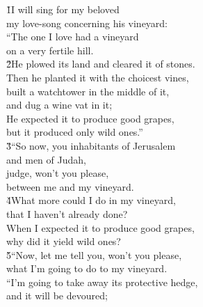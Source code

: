 \begin{poetry}
\poeml {}
\v{1}I will sing for my beloved \\
\poemll    my love-song concerning his vineyard: \\
\poeml ``The one I love had a vineyard \\
\poemll    on a very fertile hill. \\
\poeml \v{2}He plowed its land and cleared it of stones. \\
\poemll    Then he planted it with the choicest vines, \\
\poeml built a watchtower in the middle of it, \\
\poemll    and dug a wine vat in it; \\
\poeml He expected it to produce good grapes, \\
\poemll    but it produced only wild ones.'' \\
\poeml \v{3}``So now, you inhabitants of Jerusalem \\
\poemll    and men of Judah, \\
\poeml judge, won't you please, \\
\poemll    between me and my vineyard. \\
\poeml \v{4}What more could I do in my vineyard, \\
\poemll    that I haven't already done? \\
\poeml When I expected it to produce good grapes, \\
\poemll    why did it yield wild ones? \\
\poeml \v{5}``Now, let me tell you, won't you please, \\
\poemll    what I'm going to do to my vineyard. \\
\poeml ``I'm going to take away its protective hedge, \\
\poemll    and it will be devoured; \\

\end{poetry}
